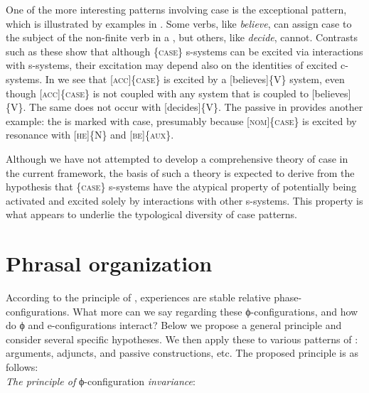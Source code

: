   One of the more interesting patterns involving case is the exceptional  pattern, which is illustrated by examples in . Some verbs, like \textit{believe}, can assign case to the subject of the non-finite verb in a , but others, like \textit{decide}, cannot. Contrasts such as these show that although \{\textsc{case}\} s-systems can be excited via interactions with s-systems, their excitation may depend also on the identities of excited c-systems. In  we see that \textsc{[acc]\{case\}} is excited by a [believes]\{V\} system, even though \textsc{[acc]\{case\}} is not coupled with any system that is coupled to [believes]\{V\}. The same does not occur with [decides]\{V\}. The passive in  provides another example: the  is marked with  case, presumably because [\textsc{nom}]\{\textsc{case}\} is excited by resonance with [\textsc{he}]\{N\} and [\textsc{be}]\{\textsc{aux}\}.

  \ea\label{ex:4:2}
  \z
  \z
  Although we have not attempted to develop a comprehensive theory of case in the current framework, the basis of such a theory is expected to derive from the hypothesis that \{\textsc{case}\} s-systems have the atypical property of potentially being activated and excited solely by interactions with other s-systems. This property is what appears to underlie the typological diversity of case patterns. 

\section{Phrasal organization}

According to the principle of ,  experiences are stable relative phase-configurations. What more can we say regarding these ϕ-configurations, and how do ϕ and e-configurations interact? Below we propose a general principle and consider several specific hypotheses. We then apply these to various patterns of : arguments, adjuncts,  and passive constructions, etc. The proposed principle is as follows:\\

\textit{The principle of} ϕ-configuration \textit{invariance}: 

